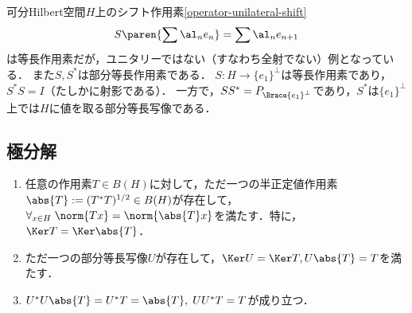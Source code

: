 \documentclass[uplatex,dvipdfmx]{jsreport}
\begin{document}
\begin{example}
    可分Hilbert空間$H$上のシフト作用素\ref{operator-unilateral-shift}
    \[S\paren{\sum\al_ne_n}=\sum\al_ne_{n+1}\]
    は等長作用素だが，ユニタリーではない（すなわち全射でない）例となっている．
    また$S,S^*$は部分等長作用素である．
    $S:H\to\{e_1\}^\perp$は等長作用素であり，$S^*S=I$（たしかに射影である）．
    一方で，$SS^*=P_{\Brace{e_1}^\perp}$であり，$S^*$は$\{e_1\}^\perp$上では$H$に値を取る部分等長写像である．
\end{example}

\subsection{極分解}

\begin{theorem}\mbox{}\label{thm-polar-decomposition}
    \begin{enumerate}
        \item 任意の作用素$T\in B(H)$に対して，ただ一つの半正定値作用素$\abs{T}:=(T^*T)^{1/2}\in B(H)$が存在して，$\forall_{x\in H}\;\norm{Tx}=\norm{\abs{T}x}$を満たす．特に，$\Ker T=\Ker\abs{T}$．
        \item ただ一つの部分等長写像$U$が存在して，$\Ker U=\Ker T,U\abs{T}=T$を満たす．
        \item $U^*U\abs{T}=U^*T=\abs{T},\;UU^*T=T$が成り立つ．
    \end{enumerate}
\end{theorem}
\end{document}
